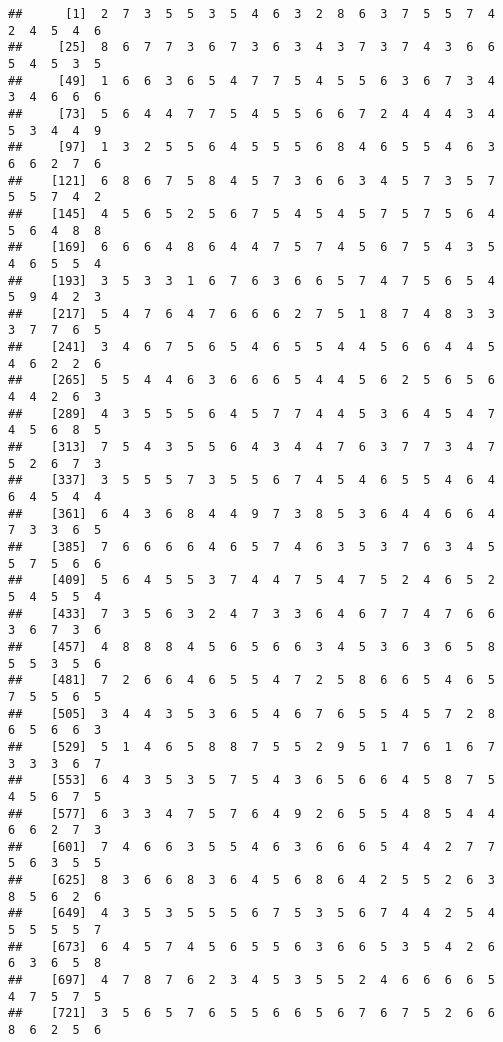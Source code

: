 \documentclass[
]{book}
\begin{document}
\begin{verbatim}
##      [1]  2  7  3  5  5  3  5  4  6  3  2  8  6  3  7  5  5  7  4  2  4  5  4  6
##     [25]  8  6  7  7  3  6  7  3  6  3  4  3  7  3  7  4  3  6  6  5  4  5  3  5
##     [49]  1  6  6  3  6  5  4  7  7  5  4  5  5  6  3  6  7  3  4  3  4  6  6  6
##     [73]  5  6  4  4  7  7  5  4  5  5  6  6  7  2  4  4  4  3  4  5  3  4  4  9
##     [97]  1  3  2  5  5  6  4  5  5  5  6  8  4  6  5  5  4  6  3  6  6  2  7  6
##    [121]  6  8  6  7  5  8  4  5  7  3  6  6  3  4  5  7  3  5  7  5  5  7  4  2
##    [145]  4  5  6  5  2  5  6  7  5  4  5  4  5  7  5  7  5  6  4  5  6  4  8  8
##    [169]  6  6  6  4  8  6  4  4  7  5  7  4  5  6  7  5  4  3  5  4  6  5  5  4
##    [193]  3  5  3  3  1  6  7  6  3  6  6  5  7  4  7  5  6  5  4  5  9  4  2  3
##    [217]  5  4  7  6  4  7  6  6  6  2  7  5  1  8  7  4  8  3  3  3  7  7  6  5
##    [241]  3  4  6  7  5  6  5  4  6  5  5  4  4  5  6  6  4  4  5  4  6  2  2  6
##    [265]  5  5  4  4  6  3  6  6  6  5  4  4  5  6  2  5  6  5  6  4  4  2  6  3
##    [289]  4  3  5  5  5  6  4  5  7  7  4  4  5  3  6  4  5  4  7  4  5  6  8  5
##    [313]  7  5  4  3  5  5  6  4  3  4  4  7  6  3  7  7  3  4  7  5  2  6  7  3
##    [337]  3  5  5  5  7  3  5  5  6  7  4  5  4  6  5  5  4  6  4  6  4  5  4  4
##    [361]  6  4  3  6  8  4  4  9  7  3  8  5  3  6  4  4  6  6  4  7  3  3  6  5
##    [385]  7  6  6  6  6  4  6  5  7  4  6  3  5  3  7  6  3  4  5  5  7  5  6  6
##    [409]  5  6  4  5  5  3  7  4  4  7  5  4  7  5  2  4  6  5  2  5  4  5  5  4
##    [433]  7  3  5  6  3  2  4  7  3  3  6  4  6  7  7  4  7  6  6  3  6  7  3  6
##    [457]  4  8  8  8  4  5  6  5  6  6  3  4  5  3  6  3  6  5  8  5  5  3  5  6
##    [481]  7  2  6  6  4  6  5  5  4  7  2  5  8  6  6  5  4  6  5  7  5  5  6  5
##    [505]  3  4  4  3  5  3  6  5  4  6  7  6  5  5  4  5  7  2  8  6  5  6  6  3
##    [529]  5  1  4  6  5  8  8  7  5  5  2  9  5  1  7  6  1  6  7  3  3  3  6  7
##    [553]  6  4  3  5  3  5  7  5  4  3  6  5  6  6  4  5  8  7  5  4  5  6  7  5
##    [577]  6  3  3  4  7  5  7  6  4  9  2  6  5  5  4  8  5  4  4  6  6  2  7  3
##    [601]  7  4  6  6  3  5  5  4  6  3  6  6  6  5  4  4  2  7  7  5  6  3  5  5
##    [625]  8  3  6  6  8  3  6  4  5  6  8  6  4  2  5  5  2  6  3  8  5  6  2  6
##    [649]  4  3  5  3  5  5  5  6  7  5  3  5  6  7  4  4  2  5  4  5  5  5  5  7
##    [673]  6  4  5  7  4  5  6  5  5  6  3  6  6  5  3  5  4  2  6  6  3  6  5  8
##    [697]  4  7  8  7  6  2  3  4  5  3  5  5  2  4  6  6  6  6  5  4  7  5  7  5
##    [721]  3  5  6  5  7  6  5  5  6  6  5  6  7  6  7  5  2  6  6  8  6  2  5  6

\end{verbatim}
\end{document}
